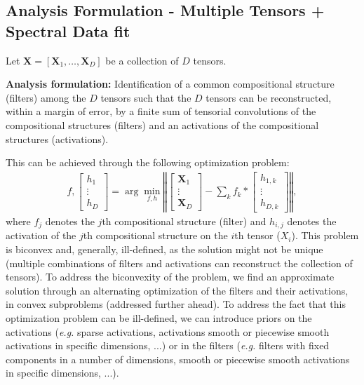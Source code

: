 \documentclass[12pt, a4paper, twoside,draft]{article}
\begin{document}
\subsection{Analysis Formulation - Multiple Tensors + Spectral Data fit}
Let $\mathbf{X} = [\mathbf{X}_1, \hdots, \mathbf{X}_D ]$ be a collection of $D$ tensors.
\begin{framed}
\textbf{Analysis formulation:} Identification of a common compositional structure (filters) among the $D$ tensors such that the $D$ tensors can be reconstructed, within a margin of error, by a finite sum of tensorial convolutions of the compositional structures (filters) and an activations of the compositional structures (activations).
\end{framed}
This can be achieved through the following optimization problem:
\begin{align}
f, \left[ \begin{matrix}h_1 \\ \vdots \\ h_D \end{matrix} \right] = \arg \min_{f,h} \left\Vert \left[ \begin{matrix}\mathbf{X}_1 \\ \vdots \\ \mathbf{X}_D \end{matrix} \right] - \sum_k f_k \ast  \left[ \begin{matrix}h_{1,k} \\ \vdots \\ h_{D,k} \end{matrix} \right] \right\Vert,
\end{align}
where $f_j$ denotes the $j$th compositional structure (filter) and $h_{i,j}$ denotes the activation of the $j$th compositional structure on the $i$th tensor ($X_i$).
This problem is biconvex and, generally, ill-defined, as the solution might not be unique (multiple combinations of filters and activations can reconstruct the collection of tensors).
To address the biconvexity of the problem, we find an approximate solution through an alternating optimization of the filters and their activations, in convex subproblems (addressed further ahead).
To address the fact that this optimization problem can be ill-defined, we can introduce priors on the activations (\emph{e.g.} sparse activations, activations smooth or piecewise smooth activations in specific dimensions, ...) or in the filters (\emph{e.g.} filters with fixed components in a number of dimensions, smooth or piecewise smooth activations in specific dimensions, ...).
\end{document}
